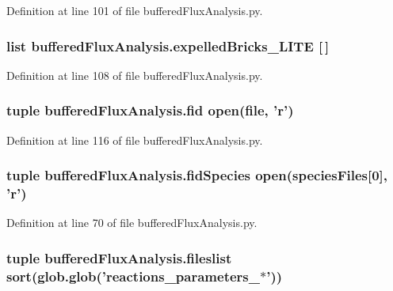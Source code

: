 Definition at line 101 of file buffered\-Flux\-Analysis.\-py.

\hypertarget{namespacebuffered_flux_analysis_a6add3eeb2b7903c31bd378684f0ae0f7}{
\subsubsection[{expelled\-Bricks\-\_\-\-L\-I\-T\-E}]{\setlength{\rightskip}{0pt plus 5cm}list buffered\-Flux\-Analysis.\-expelled\-Bricks\-\_\-\-L\-I\-T\-E \mbox{[}$\,$\mbox{]}}}\label{namespacebuffered_flux_analysis_a6add3eeb2b7903c31bd378684f0ae0f7}


Definition at line 108 of file buffered\-Flux\-Analysis.\-py.

\hypertarget{namespacebuffered_flux_analysis_a490a31896b3a0812a6e9ed57cd4be1c9}{
\subsubsection[{fid}]{\setlength{\rightskip}{0pt plus 5cm}tuple buffered\-Flux\-Analysis.\-fid open({\bf file}, '{\bf r}')}}\label{namespacebuffered_flux_analysis_a490a31896b3a0812a6e9ed57cd4be1c9}


Definition at line 116 of file buffered\-Flux\-Analysis.\-py.

\hypertarget{namespacebuffered_flux_analysis_a56ea4478f0de4eca040d22421819e250}{
\subsubsection[{fid\-Species}]{\setlength{\rightskip}{0pt plus 5cm}tuple buffered\-Flux\-Analysis.\-fid\-Species open({\bf species\-Files}\mbox{[}0\mbox{]}, '{\bf r}')}}\label{namespacebuffered_flux_analysis_a56ea4478f0de4eca040d22421819e250}


Definition at line 70 of file buffered\-Flux\-Analysis.\-py.

\hypertarget{namespacebuffered_flux_analysis_a0d1da0381917a4cdca814e4d430ff367}{
\subsubsection[{fileslist}]{\setlength{\rightskip}{0pt plus 5cm}tuple buffered\-Flux\-Analysis.\-fileslist sort(glob.\-glob('reactions\-\_\-parameters\-\_\-$\ast$'))}}\label{namespacebuffered_flux_analysis_a0d1da0381917a4cdca814e4d430ff367}


